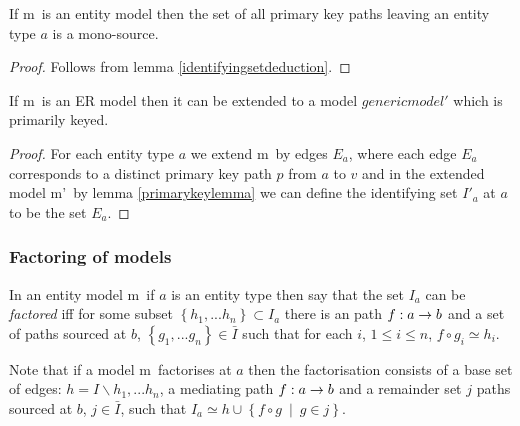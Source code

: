 \documentclass[10pt,a4paper]{article}
\newcommand{\setsuchthat}[2]{\left\{#1 \ \middle|\ #2\right\}}
\newcommand{\set}[1]{\left\{#1\right\}}
\newcommand{\genericmodel}{\mathcal{M}}
\renewcommand{\genericmodel}{{m}}
\newcommand{\veee}{v}
\newcommand{\term}[1]{\textit{{#1}}}
\begin{document}
\begin{lemma}
\label{primarykeylemma}
If \genericmodel\ is an entity model then the set of all primary key paths leaving an entity type $a$ is a mono-source.
\end{lemma}
\begin{proof}
Follows from lemma \ref{identifyingsetdeduction}.
\end{proof}

\begin{lemma}
If \genericmodel\ is an ER model then it can be extended to a model $genericmodel'$
which is primarily keyed.
\end{lemma}
\begin{proof}
For each entity type $a$ we extend \genericmodel\ by edges $E_a$, where each edge 
$E_a$ corresponds to a distinct primary key path $p$ from $a$ to $\veee$
and in the extended model \genericmodel'\ by lemma \ref{primarykeylemma} 
we can define the identifying set $I'_a$ at $a$ to be the set
$E_a$. 
\end{proof}

\subsubsection{Factoring of models}

\begin{definition}
In an entity model \genericmodel\ if $a$ is an entity type then say that
the set $I_a$ can be \term{factored} iff for some subset $\set{h_1,...h_n} \subset I_a$
there is an path $f:a \rightarrow b$ and a set of paths sourced at $b$, $\set{g_1,...g_n} \in \bar{I}$
such that for each $i$, $1 \leq i \leq n$, $f \circ g_i \simeq h_i$. 
\end{definition}

Note that if a model \genericmodel\
factorises at $a$ then the factorisation consists  
of a base set of edges: $h=I \backslash {h_1,...h_n}$, a mediating path $f:a \rightarrow b$ and a remainder 
set $j$ paths sourced at $b$, $j \in \bar{I}$, 
such that $I_a \simeq h \cup \setsuchthat{f\circ g}{g \in j}$.
\end{document}
